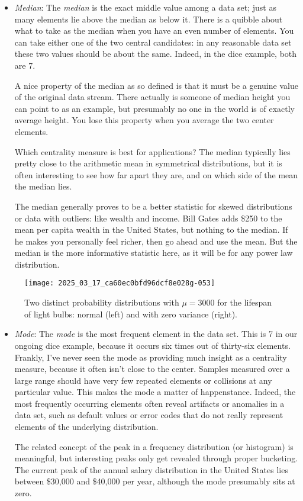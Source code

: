 \documentclass[10pt]{article}
\begin{document}
\begin{itemize}
  \item \textit{Median}: The \textit{median} is the exact middle value among a data set; just as many elements lie above the median as below it. There is a quibble about what to take as the median when you have an even number of elements. You can take either one of the two central candidates: in any reasonable data set these two values should be about the same. Indeed, in the dice example, both are 7.

A nice property of the median as so defined is that it must be a genuine value of the original data stream. There actually is someone of median height you can point to as an example, but presumably no one in the world is of exactly average height. You lose this property when you average the two center elements.

Which centrality measure is best for applications? The median typically lies pretty close to the arithmetic mean in symmetrical distributions, but it is often interesting to see how far apart they are, and on which side of the mean the median lies.

The median generally proves to be a better statistic for skewed distributions or data with outliers: like wealth and income. Bill Gates adds \$250 to the mean per capita wealth in the United States, but nothing to the median. If he makes you personally feel richer, then go ahead and use the mean. But the median is the more informative statistic here, as it will be for any power law distribution.
\end{itemize}

\begin{figure}[h!]
  \centering
  \texttt{[image: 2025\_03\_17\_ca60ec0bfd96dcf8e028g-053]}
  \caption{Two distinct probability distributions with \(\mu=3000\) for the lifespan of light bulbs: normal (left) and with zero variance (right).}
\end{figure}

\begin{itemize}
  \item \textit{Mode}: The \textit{mode} is the most frequent element in the data set. This is 7 in our ongoing dice example, because it occurs six times out of thirty-six elements. Frankly, I've never seen the mode as providing much insight as a centrality measure, because it often isn't close to the center. Samples measured over a large range should have very few repeated elements or collisions at any particular value. This makes the mode a matter of happenstance. Indeed, the most frequently occurring elements often reveal artifacts or anomalies in a data set, such as default values or error codes that do not really represent elements of the underlying distribution.

The related concept of the peak in a frequency distribution (or histogram) is meaningful, but interesting peaks only get revealed through proper bucketing. The current peak of the annual salary distribution in the United States lies between \$30,000 and \$40,000 per year, although the mode presumably sits at zero.
\end{itemize}
\end{document}
